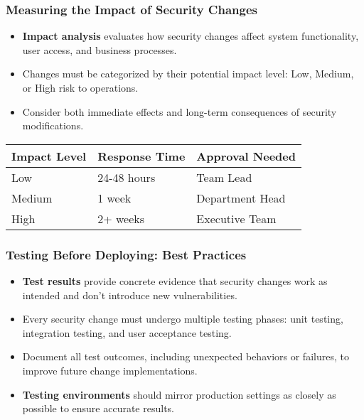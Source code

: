 \documentclass{beamer}
\begin{document}
    \begin{frame}
    \frametitle{Measuring the Impact of Security Changes}
    \begin{itemize}
        \item \textbf{Impact analysis} evaluates how security changes affect system functionality, user access, and business processes.
        
        \item Changes must be categorized by their potential impact level: Low, Medium, or High risk to operations.
        
        \item Consider both immediate effects and long-term consequences of security modifications.
    \end{itemize}
    \begin{table}
    \begin{tabular}{lll}
    \toprule
    \textbf{Impact Level} & \textbf{Response Time} & \textbf{Approval Needed} \\
    \midrule
    Low & 24-48 hours & Team Lead \\
    Medium & 1 week & Department Head \\
    High & 2+ weeks & Executive Team \\
    \bottomrule
    \end{tabular}
    \end{table}
    \end{frame}

    \begin{frame}
        \frametitle{Testing Before Deploying: Best Practices}
        \begin{itemize}
            \item \textbf{Test results} provide concrete evidence that security changes work as intended and don't introduce new vulnerabilities.
            
            \item Every security change must undergo multiple testing phases: unit testing, integration testing, and user acceptance testing.
            
            \item Document all test outcomes, including unexpected behaviors or failures, to improve future change implementations.
            
            \item \textbf{Testing environments} should mirror production settings as closely as possible to ensure accurate results.
        \end{itemize}
        \end{frame}
        
\end{document}

